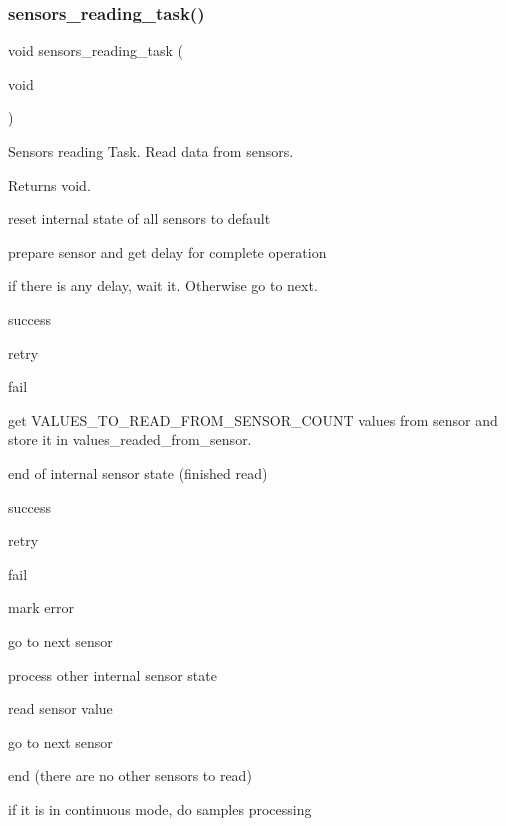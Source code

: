 \subsubsection{\texorpdfstring{sensors\+\_\+reading\+\_\+task()}{sensors\_reading\_task()}}
{\footnotesize\ttfamily void sensors\+\_\+reading\+\_\+task (\begin{DoxyParamCaption}\item[{void}]{ }\end{DoxyParamCaption})}



Sensors reading Task. Read data from sensors. 

\begin{DoxyReturn}{Returns}
void. 
\end{DoxyReturn}
reset internal state of all sensors to default

prepare sensor and get delay for complete operation

if there is any delay, wait it. Otherwise go to next.

success

retry

fail

get V\+A\+L\+U\+E\+S\+\_\+\+T\+O\+\_\+\+R\+E\+A\+D\+\_\+\+F\+R\+O\+M\+\_\+\+S\+E\+N\+S\+O\+R\+\_\+\+C\+O\+U\+NT values from sensor and store it in values\+\_\+readed\+\_\+from\+\_\+sensor.

end of internal sensor state (finished read)

success

retry

fail

mark error

go to next sensor

process other internal sensor state

read sensor value

go to next sensor

end (there are no other sensors to read)

if it is in continuous mode, do samples processing 